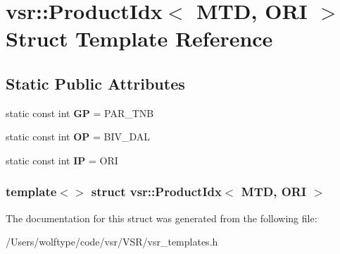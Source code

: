\hypertarget{structvsr_1_1_product_idx_3_01_m_t_d_00_01_o_r_i_01_4}{\section{vsr\-:\-:Product\-Idx$<$ M\-T\-D, O\-R\-I $>$ Struct Template Reference}
\label{structvsr_1_1_product_idx_3_01_m_t_d_00_01_o_r_i_01_4}
}
\subsection*{Static Public Attributes}
\begin{DoxyCompactItemize}
\item 
\hypertarget{structvsr_1_1_product_idx_3_01_m_t_d_00_01_o_r_i_01_4_aa7b990cfdbabe7fd15bc2cf005b654d5}{static const int {\bfseries G\-P} = P\-A\-R\-\_\-\-T\-N\-B}\label{structvsr_1_1_product_idx_3_01_m_t_d_00_01_o_r_i_01_4_aa7b990cfdbabe7fd15bc2cf005b654d5}

\item 
\hypertarget{structvsr_1_1_product_idx_3_01_m_t_d_00_01_o_r_i_01_4_a3f4052b5feca4dc35028540490bfc829}{static const int {\bfseries O\-P} = B\-I\-V\-\_\-\-D\-A\-L}\label{structvsr_1_1_product_idx_3_01_m_t_d_00_01_o_r_i_01_4_a3f4052b5feca4dc35028540490bfc829}

\item 
\hypertarget{structvsr_1_1_product_idx_3_01_m_t_d_00_01_o_r_i_01_4_a897977445435e9995944ec092c758667}{static const int {\bfseries I\-P} = O\-R\-I}\label{structvsr_1_1_product_idx_3_01_m_t_d_00_01_o_r_i_01_4_a897977445435e9995944ec092c758667}

\end{DoxyCompactItemize}
\subsubsection*{template$<$$>$ struct vsr\-::\-Product\-Idx$<$ M\-T\-D, O\-R\-I $>$}



The documentation for this struct was generated from the following file\-:\begin{DoxyCompactItemize}
\item 
/\-Users/wolftype/code/vsr/\-V\-S\-R/vsr\-\_\-templates.\-h\end{DoxyCompactItemize}
